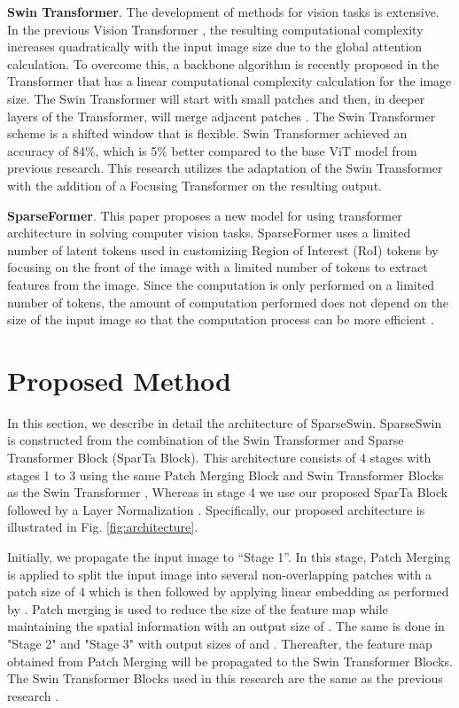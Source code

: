 \documentclass[runningheads]{llncs}
\begin{document}
\textbf{Swin Transformer}. The development of methods for vision tasks is extensive. In the previous Vision Transformer \cite{dosovitskiy2020image}, the resulting computational complexity increases quadratically with the input image size due to the global attention calculation. To overcome this, a backbone algorithm is recently proposed in the Transformer that has a linear computational complexity calculation for the image size. The Swin Transformer will start with small patches and then, in deeper layers of the Transformer, will merge adjacent patches \cite{liu2021swin}. The Swin Transformer scheme is a shifted window that is flexible. Swin Transformer achieved an accuracy of 84\%, which is 5\% better compared to the base ViT model from previous research. This research utilizes the adaptation of the Swin Transformer with the addition of a Focusing Transformer on the resulting output.

\textbf{SparseFormer}. This paper proposes a new model for using transformer architecture in solving computer vision tasks. SparseFormer uses a limited number of latent tokens used in customizing Region of Interest (RoI) tokens by focusing on the front of the image with a limited number of tokens to extract features from the image. Since the computation is only performed on a limited number of tokens, the amount of computation performed does not depend on the size of the input image so that the computation process can be more efficient \cite{gao2023sparseformer}.

\section{Proposed Method}
\label{sec:proposed_method}
In this section, we describe in detail the architecture of SparseSwin. SparseSwin is constructed from the combination of the Swin Transformer and Sparse Transformer Block (SparTa Block). This architecture consists of 4 stages with stages 1 to 3 using the same Patch Merging Block and Swin Transformer Blocks as the Swin Transformer \cite{liu2021swin}, Whereas in stage 4 we use our proposed SparTa Block followed by a Layer Normalization \cite{ba2016layer}. Specifically, our proposed architecture is illustrated in Fig. \ref{fig:architecture}.

Initially, we propagate the input image to “Stage 1”. In this stage, Patch Merging is applied to split the input image into several non-overlapping patches with a patch size of 4 which is then followed by applying linear embedding as performed by \cite{liu2021swin}. Patch merging is used to reduce the size of the feature map while maintaining the spatial information with an output size of . The same is done in "Stage 2" and "Stage 3" with output sizes of  and . Thereafter, the feature map obtained from Patch Merging will be propagated to the Swin Transformer Blocks. The Swin Transformer Blocks used in this research are the same as the previous research \cite{liu2021swin}. 
\end{document}
